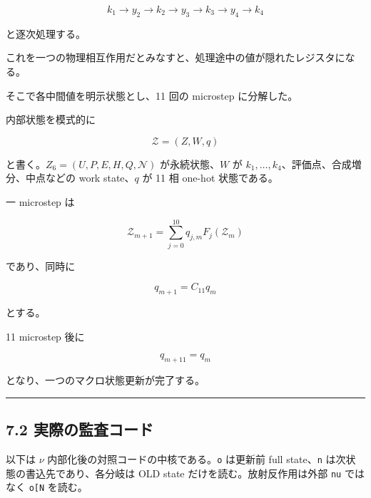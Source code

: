 \documentclass[
  a4paper,
]{ltjsarticle}
\begin{document}
\[
k_1\rightarrow y_2\rightarrow k_2\rightarrow y_3\rightarrow k_3\rightarrow y_4\rightarrow k_4
\]

と逐次処理する。

これを一つの物理相互作用だとみなすと、処理途中の値が隠れたレジスタになる。

そこで各中間値を明示状態とし、11 回の microstep に分解した。

内部状態を模式的に

\[
\mathcal Z
=(Z,W,q)
\]

と書く。\(Z_6=(U,P,E,H,Q,\mathcal N)\) が永続状態、\(W\) が
\(k_1,\ldots,k_4\)、評価点、合成増分、中点などの work state、\(q\) が 11
相 one-hot 状態である。

一 microstep は

\[
\boxed{
\mathcal Z_{m+1}
=
\sum_{j=0}^{10}q_{j,m}F_j(\mathcal Z_m)
}
\]

であり、同時に

\[
\boxed{
q_{m+1}=C_{11}q_m
}
\]

とする。

11 microstep 後に

\[
q_{m+11}=q_m
\]

となり、一つのマクロ状態更新が完了する。

\begin{center}\rule{0.5\linewidth}{0.5pt}\end{center}

\subsection{7.2
実際の監査コード}\label{ux5b9fux969bux306eux76e3ux67fbux30b3ux30fcux30c9}

以下は \(\nu\) 内部化後の対照コードの中核である。\texttt{o} は更新前
full state、\texttt{n} は次状態の書込先であり、各分岐は OLD state
だけを読む。放射反作用は外部 \texttt{nu} ではなく
\texttt{o{[}\textquotesingle{}N\textquotesingle{}{]}} を読む。
\end{document}
